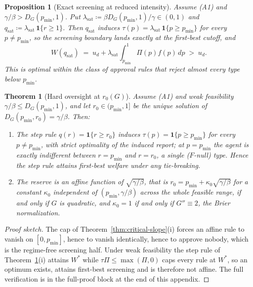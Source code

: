 \documentclass[10pt,a4paper]{amsart}
\newtheorem{theorem}{Theorem}
\newtheorem{proposition}{Proposition}
\newcommand{\suppsec}[1]{the full-proof block at the end of this appendix}
\begin{document}
\begin{proposition}[Exact screening at reduced intensity]\label{prop:lambda-sat}
Assume (A1) and $\gamma/\beta > D_G(p_{\min},1)$. Put $\lambda_{\mathrm{sat}} \coloneqq \beta D_G(p_{\min},1)/\gamma \in (0,1)$ and $q_{\mathrm{sat}} \coloneqq \lambda_{\mathrm{sat}}\,\mathbf 1\{r \ge 1\}$. Then $q_{\mathrm{sat}}$ induces $\tau(p) = \lambda_{\mathrm{sat}}\,\mathbf 1\{p \ge p_{\min}\}$ for every $p \ne p_{\min}$, so the screening boundary lands exactly at the first-best cutoff, and
\[
W(q_{\mathrm{sat}}) \;=\; u_d + \lambda_{\mathrm{sat}}\int_{p_{\min}}^1 \Pi(p) f(p)\, dp \;>\; u_d .
\]
This is optimal within the class of approval rules that reject almost every type below $p_{\min}$.
\end{proposition}

\begin{theorem}[Hard oversight at $r_0(G)$]\label{thm:reserve}
Assume (A1) and weak feasibility $\gamma/\beta \le D_G(p_{\min},1)$, and let $r_0 \in (p_{\min},1]$ be the unique solution of $D_G(p_{\min},r_0) = \gamma/\beta$. Then:
\begin{enumerate}
\item[(i)] The step rule $q(r) = \mathbf 1\{r \ge r_0\}$ induces $\tau(p) = \mathbf 1\{p \ge p_{\min}\}$ for every $p \ne p_{\min}$, with strict optimality of the induced report; at $p = p_{\min}$ the agent is exactly indifferent between $r = p_{\min}$ and $r = r_0$, a single ($F$-null) type. Hence the step rule attains first-best welfare under any tie-breaking.
\item[(ii)] The reserve is an affine function of $\sqrt{\gamma/\beta}$, that is $r_0 = p_{\min} + \kappa_0\sqrt{\gamma/\beta}$ for a constant $\kappa_0$ independent of $(p_{\min},\gamma/\beta)$ across the whole feasible range, if and only if $G$ is quadratic, and $\kappa_0 = 1$ if and only if $G'' \equiv 2$, the Brier normalization.
\end{enumerate}
\end{theorem}

\begin{proof}[Proof sketch]
The cap of Theorem~\ref{thm:critical-slope}(i) forces an affine rule to vanish on $[0,p_{\min}]$, hence to vanish identically, hence to approve nobody, which is the regime-free screening half. Under weak feasibility the step rule of Theorem~\ref{thm:reserve}(i) attains $W^*$ while $\tau\Pi\leq\max(\Pi,0)$ caps every rule at $W^*$, so an optimum exists, attains first-best screening and is therefore not affine. The full verification is in \suppsec{S.4}.
\end{proof}
\end{document}
